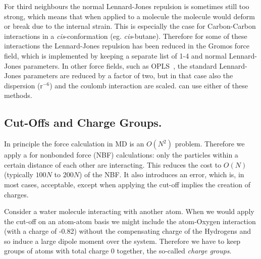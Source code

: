 For third neighbours the normal Lennard-Jones repulsion is sometimes
still too strong, which means that when applied to a molecule the
molecule would deform or break due to the internal strain. This is
especially the case for Carbon-Carbon interactions in a {\em
cis}-conformation (eg. {\em cis}-butane).  Therefore for some of these
interactions the Lennard-Jones repulsion has been reduced in the
Gromos force field, which is implemented by keeping a separate list of
1-4 and normal Lennard-Jones parameters. In other force fields, such
as OPLS~\cite{Jorgensen88}, the standard Lennard-Jones parameters are reduced
by a factor of two, but in that case also the dispersion (r$^{-6}$)
and the coulomb interaction are scaled.
{\gromacs} can use either of these methods.

\subsection{Cut-Offs and Charge Groups.}
In principle the force calculation in MD is an $O(N^2)$ problem. 
Therefore we apply a  
for nonbonded force (NBF) calculations:
only the particles within a certain distance of each other
are interacting. This reduces the cost to $O(N)$ (typically
$100N$ to $200N$) of the NBF. It also introduces an error,
which is, in most cases, acceptable, except when applying the cut-off
implies the creation of charges.

Consider a water molecule interacting with another atom. When we would apply
the cut-off on an atom-atom basis we might include the atom-Oxygen
interaction (with a charge of -0.82) without the compensating charge
of the Hydrogens and so induce a large dipole moment over the system.
Therefore we have to keep groups of atoms with total charge
0 together, the so-called {\em charge groups}.

